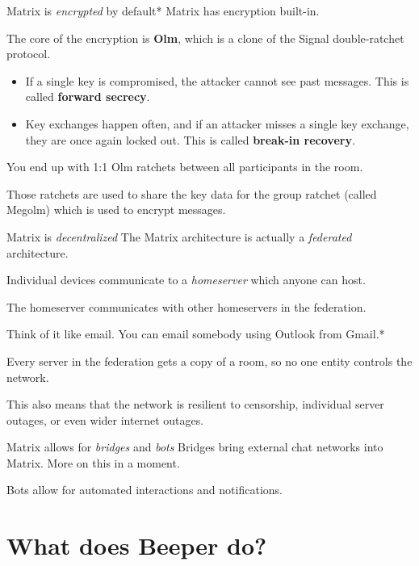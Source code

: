 \documentclass{acm}
\begin{document}
\begin{frame}{Matrix is \textit{encrypted} by default*}
    Matrix has encryption built-in.

    The core of the encryption is \textbf{Olm}, which is a clone of the Signal
    double-ratchet protocol.
    \begin{itemize}
        \item If a single key is compromised, the attacker cannot see past
            messages. This is called \textbf{forward secrecy}.
        \item Key exchanges happen often, and if an attacker misses a single key
            exchange, they are once again locked out. This is called
            \textbf{break-in recovery}.
    \end{itemize}
    \pause

    You end up with 1:1 Olm ratchets between all participants in the room.
    \pause

    Those ratchets are used to share the key data for the group ratchet (called
    Megolm) which is used to encrypt messages.
\end{frame}

\begin{frame}{Matrix is \textit{decentralized}}
    The Matrix architecture is actually a \textit{federated} architecture.

    Individual devices communicate to a \textit{homeserver} which anyone can
    host.

    The homeserver communicates with other homeservers in the federation.
    \pause

    Think of it like email. You can email somebody using Outlook from Gmail.*
    \pause

    Every server in the federation gets a copy of a room, so no one entity
    controls the network.
    \pause

    This also means that the network is resilient to censorship, individual
    server outages, or even wider internet outages.
\end{frame}

\begin{frame}{Matrix allows for \textit{bridges} and \textit{bots}}
    Bridges bring external chat networks into Matrix. More on this in a moment.
    \pause

    Bots allow for automated interactions and notifications.
\end{frame}

\section{What does Beeper do?}
\end{document}
